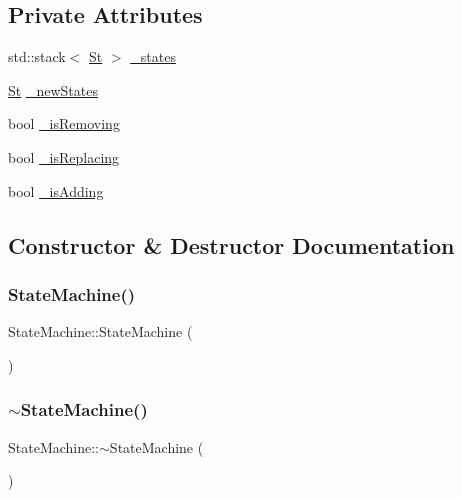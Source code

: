 \subsection*{Private Attributes}
\begin{DoxyCompactItemize}
\item 
std\+::stack$<$ \hyperlink{state__machine_8h_aa31b7a5a5d2d34ce28ae8e5c4624f788}{St} $>$ \hyperlink{classStateMachine_ade8cf04e7020927c6e8ad2d714ff1ad8}{\+\_\+states}
\item 
\hyperlink{state__machine_8h_aa31b7a5a5d2d34ce28ae8e5c4624f788}{St} \hyperlink{classStateMachine_ac6f04aeb1c8dd6d5a5d5f28f56734eba}{\+\_\+new\+States}
\item 
bool \hyperlink{classStateMachine_a08cb3324baf98cd027565aaee67ab016}{\+\_\+is\+Removing}
\item 
bool \hyperlink{classStateMachine_abb01bcc9617e9978db7afc34e03ba8d8}{\+\_\+is\+Replacing}
\item 
bool \hyperlink{classStateMachine_a806fb4068124f055f628e3563b4ca9b1}{\+\_\+is\+Adding}
\end{DoxyCompactItemize}


\subsection{Constructor \& Destructor Documentation}
\mbox{\label{classStateMachine_a2fb07002510ea9141019559750acfab8}} 
\subsubsection{\texorpdfstring{State\+Machine()}{StateMachine()}}
{\footnotesize\ttfamily State\+Machine\+::\+State\+Machine (\begin{DoxyParamCaption}{ }\end{DoxyParamCaption})\hspace{0.3cm}{\ttfamily [inline]}}

\mbox{\label{classStateMachine_a93d66cb2a89b186789d655a08b02674e}} 
\subsubsection{\texorpdfstring{$\sim$\+State\+Machine()}{~StateMachine()}}
{\footnotesize\ttfamily State\+Machine\+::$\sim$\+State\+Machine (\begin{DoxyParamCaption}{ }\end{DoxyParamCaption})\hspace{0.3cm}{\ttfamily [inline]}}



